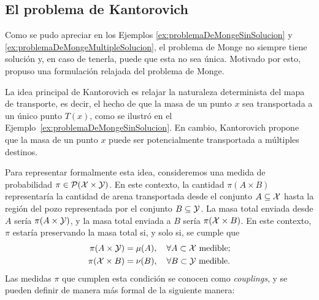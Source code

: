 {{	  %

  }

  \subsection*{El problema de Kantorovich}
  {
	  Como se pudo apreciar en los Ejemplos \ref*{ex:problemaDeMongeSinSolucion} y \ref*{ex:problemaDeMongeMultipleSolucion}, el problema de Monge no siempre tiene solución y, en caso de tenerla, puede que esta no sea única. Motivado por esto, \cite{kantorovich1942translocation} propuso una formulación relajada del problema de Monge.

	  La idea principal de Kantorovich es relajar la naturaleza determinista del mapa de transporte, es decir, el hecho de que la masa de un punto $x$ sea transportada a un único punto $T(x)$, como se ilustró en el Ejemplo~\ref{ex:problemaDeMongeSinSolucion}. En cambio, Kantorovich propone que la masa de un punto $x$ puede ser potencialmente transportada a múltiples destinos.

	  Para representar formalmente esta idea, consideremos una medida de probabilidad $\pi \in \ProbSpace[\cX \times \cY]$. En este contexto, la cantidad $\pi(A \times B)$ representaría la cantidad de arena transportada desde el conjunto $A \subseteq \cX$ hasta la región del pozo representada por el conjunto $B \subseteq \cY$. La masa total enviada desde $A$ sería $\pi(A \times \cY)$, y la masa total enviada a $B$ sería $\pi(\cX \times B)$. En este contexto, $\pi$ estaría preservando la masa total si, y solo si, se cumple que
	  \begin{align*}
		  \pi(A \times \cY) & = \mu(A), \quad \forall A \subset \cX \text{ medible;} \\
		  \pi(\cX \times B) & = \nu(B),\quad \forall B \subset \cY \text{ medible.}
	  \end{align*}
	  Las medidas $\pi$ que cumplen esta condición se conocen como \emph{couplings}, y se pueden definir de manera más formal de la siguiente manera:


}}
